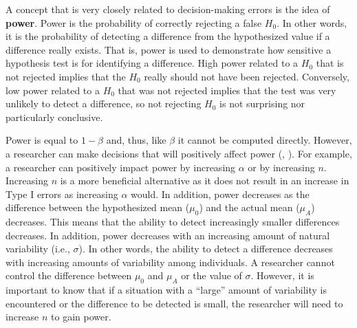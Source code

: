 \documentclass[10pt,openany]{book}\usepackage[]{graphicx}\usepackage[]{color}
\begin{document}
A concept that is very closely related to decision-making errors is the idea of \textbf{power}.  Power is the probability of correctly rejecting a false $H_{0}$.  In other words, it is the probability of detecting a difference from the hypothesized value if a difference really exists.  That is, power is used to demonstrate how sensitive a hypothesis test is for identifying a difference.  High power related to a $H_{0}$ that is not rejected implies that the $H_{0}$ really should not have been rejected.  Conversely, low power related to a $H_{0}$ that was not rejected implies that the test was very unlikely to detect a difference, so not rejecting $H_{0}$ is not surprising nor particularly conclusive.


Power is equal to $1-\beta$ and, thus, like $\beta$ it cannot be computed directly.  However, a researcher can make decisions that will positively affect power (, ).  For example, a researcher can positively impact power by increasing $\alpha$ or by increasing $n$.  Increasing $n$ is a more beneficial alternative as it does not result in an increase in Type I errors as increasing $\alpha$ would.  In addition, power decreases as the difference between the hypothesized mean ($\mu_{0}$) and the actual mean ($\mu_{A}$) decreases.  This means that the ability to detect increasingly smaller differences decreases.  In addition, power decreases with an increasing amount of natural variability (i.e., $\sigma$).  In other words, the ability to detect a difference decreases with increasing amounts of variability among individuals.  A researcher cannot control the difference between $\mu_{0}$ and $\mu_{A}$ or the value of $\sigma$.  However, it is important to know that if a situation with a ``large'' amount of variability is encountered or the difference to be detected is small, the researcher will need to increase $n$ to gain power.


\vspace{-12pt}

\vspace{-12pt}
\end{document}
